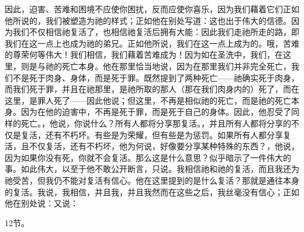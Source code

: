 因此，迫害、苦难和困境不应使你困扰，反而应使你喜乐，因为我们藉着它们正如他所说的，我们被塑造为祂的样式；正如他在别处写道：这也出于伟大的信德。因为我们不仅相信祂复活了，也相信祂复活后拥有大能：因此我们走祂所走的路，即我们在这一点上也成为祂的弟兄。正如他所说，我们在这一点上成为的。哦，苦难的尊荣何等伟大！我们相信，我们藉着苦难成为！因为如在圣洗中，我们，在这里，则是与祂的死亡本身。他在那里恰当地说，因为在那里我们并非完全死亡，我们不是死于肉身、身体，而是死于罪。既然提到了两种死亡——祂确实死于肉身，而我们死于罪，并且在祂那里，是祂所取的那人（那在我们肉身内的）死了，而在这里，是罪人死了——因此他说；但这里，不再是相似祂的死亡，而是祂的死亡本身。因为在他的迫害中，不再是死于罪，而是死于自己的身体。因此，他忍受了同样的死亡。，他说，你说什么？所有人都将分享那复活。，并且所有人都将分享的不仅是复活，还有不朽坏。有些是为荣耀，但有些是为惩罚。如果所有人都分享复活，且不仅复活，还有不朽坏，他为何说，好像要分享某种特殊的东西？，他说，因为如果你没有死，你就不会复活。那么这是什么意思？似乎暗示了一件伟大的事。如此伟大，以至于他不敢公开断言，只说。我相信祂和祂的复活，而且我还为祂受苦，但我仍不能对复活有信心。他在这里提到的是什么复活？那就是通往本身的复活。我说，我相信，并且我，并且我然而在这些之后，我丝毫没有信心；正如他在别处说：又说：\par

12节。\par

